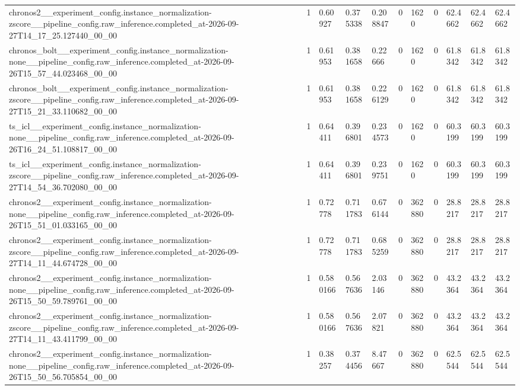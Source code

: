\begin{tabular}{lllllllllll}
chronos2\_\_experiment\_config.instance\_normalization-zscore\_\_pipeline\_config.raw\_inference.completed\_at-2026-09-27T14\_17\_25.127440\_00\_00 & 1 & 0.60927 & 0.375338 & 0.208847 & 0 & 1620 & 0 & 62.4662 & 62.4662 & 62.4662 \\
chronos\_bolt\_\_experiment\_config.instance\_normalization-none\_\_pipeline\_config.raw\_inference.completed\_at-2026-09-26T15\_57\_44.023468\_00\_00 & 1 & 0.61953 & 0.381658 & 0.22666 & 0 & 1620 & 0 & 61.8342 & 61.8342 & 61.8342 \\
chronos\_bolt\_\_experiment\_config.instance\_normalization-zscore\_\_pipeline\_config.raw\_inference.completed\_at-2026-09-27T15\_21\_33.110682\_00\_00 & 1 & 0.61953 & 0.381658 & 0.226129 & 0 & 1620 & 0 & 61.8342 & 61.8342 & 61.8342 \\
ts\_icl\_\_experiment\_config.instance\_normalization-none\_\_pipeline\_config.raw\_inference.completed\_at-2026-09-26T16\_24\_51.108817\_00\_00 & 1 & 0.64411 & 0.396801 & 0.234573 & 0 & 1620 & 0 & 60.3199 & 60.3199 & 60.3199 \\
ts\_icl\_\_experiment\_config.instance\_normalization-zscore\_\_pipeline\_config.raw\_inference.completed\_at-2026-09-27T14\_54\_36.702080\_00\_00 & 1 & 0.64411 & 0.396801 & 0.239751 & 0 & 1620 & 0 & 60.3199 & 60.3199 & 60.3199 \\
chronos2\_\_experiment\_config.instance\_normalization-none\_\_pipeline\_config.raw\_inference.completed\_at-2026-09-26T15\_51\_01.033165\_00\_00 & 1 & 0.72778 & 0.711783 & 0.676144 & 0 & 362880 & 0 & 28.8217 & 28.8217 & 28.8217 \\
chronos2\_\_experiment\_config.instance\_normalization-zscore\_\_pipeline\_config.raw\_inference.completed\_at-2026-09-27T14\_11\_44.674728\_00\_00 & 1 & 0.72778 & 0.711783 & 0.685259 & 0 & 362880 & 0 & 28.8217 & 28.8217 & 28.8217 \\
chronos2\_\_experiment\_config.instance\_normalization-none\_\_pipeline\_config.raw\_inference.completed\_at-2026-09-26T15\_50\_59.789761\_00\_00 & 1 & 0.580166 & 0.567636 & 2.03146 & 0 & 362880 & 0 & 43.2364 & 43.2364 & 43.2364 \\
chronos2\_\_experiment\_config.instance\_normalization-zscore\_\_pipeline\_config.raw\_inference.completed\_at-2026-09-27T14\_11\_43.411799\_00\_00 & 1 & 0.580166 & 0.567636 & 2.07821 & 0 & 362880 & 0 & 43.2364 & 43.2364 & 43.2364 \\
chronos2\_\_experiment\_config.instance\_normalization-none\_\_pipeline\_config.raw\_inference.completed\_at-2026-09-26T15\_50\_56.705854\_00\_00 & 1 & 0.38257 & 0.374456 & 8.47667 & 0 & 362880 & 0 & 62.5544 & 62.5544 & 62.5544 \\

\end{tabular}

